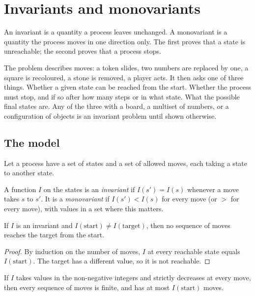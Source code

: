 \section{Invariants and monovariants}
\label{sec:invariants}

An invariant is a quantity a process leaves unchanged. A monovariant is a quantity the process moves in one direction only. The first proves that a state is unreachable; the second proves that a process stops.

\begin{recognise}
The problem describes moves: a token slides, two numbers are replaced by one, a square is recoloured, a stone is removed, a player acts. It then asks one of three things. Whether a given state can be reached from the start. Whether the process must stop, and if so after how many steps or in what state. What the possible final states are. Any of the three with a board, a multiset of numbers, or a configuration of objects is an invariant problem until shown otherwise.
\end{recognise}

\subsection*{The model}

Let a process have a set of states and a set of allowed moves, each taking a state to another state.

\begin{definition}
A function $I$ on the states is an \emph{invariant} if $I(s') = I(s)$ whenever a move takes $s$ to $s'$. It is a \emph{monovariant} if $I(s') < I(s)$ for every move (or $>$ for every move), with values in a set where this matters.
\end{definition}

\begin{theorem}
If $I$ is an invariant and $I(\text{start}) \ne I(\text{target})$, then no sequence of moves reaches the target from the start.
\end{theorem}

\begin{proof}
By induction on the number of moves, $I$ at every reachable state equals $I(\text{start})$. The target has a different value, so it is not reachable.
\end{proof}

\begin{theorem}
If $I$ takes values in the non-negative integers and strictly decreases at every move, then every sequence of moves is finite, and has at most $I(\text{start})$ moves.
\end{theorem}

